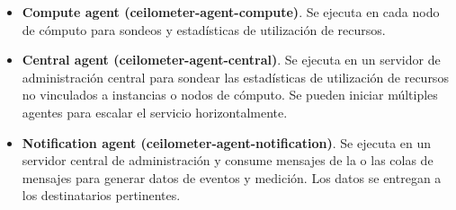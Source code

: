 \begin{itemize}
\item \textbf{Compute agent (ceilometer-agent-compute)}. Se ejecuta en cada nodo de cómputo para sondeos y estadísticas de utilización de recursos.
\item \textbf{Central agent (ceilometer-agent-central)}. Se ejecuta en un servidor de administración central para sondear las estadísticas de utilización de recursos no vinculados a instancias o nodos de cómputo. Se pueden iniciar múltiples agentes para escalar el servicio horizontalmente. 
\item\textbf{Notification agent (ceilometer-agent-notification)}. Se ejecuta en un servidor central de administración y consume mensajes de la o las colas de mensajes para generar datos de eventos y medición. Los datos se entregan a los destinatarios pertinentes.
\end{itemize}




